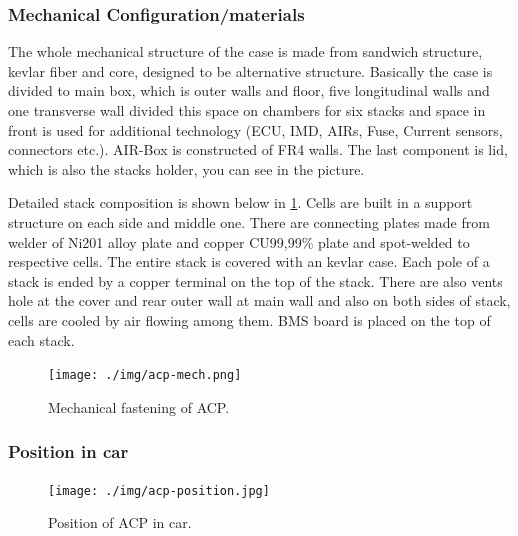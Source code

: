 \subsubsection{Mechanical Configuration/materials}

The whole mechanical structure of the case is made from sandwich structure, kevlar fiber and core, designed to be alternative structure. Basically the case is divided to main box, which is outer walls and floor, five longitudinal walls and one transverse wall divided this space on chambers for six stacks and space in front is used for additional technology (ECU, IMD, AIRs, Fuse, Current sensors, connectors etc.). AIR-Box is constructed of FR4 walls. The last component is lid, which is also the stacks holder, you can see in the picture.

Detailed stack composition is shown below in \ref{fig:acp-mech}. Cells are built in a support structure on each side and middle one. There are connecting plates made from welder of Ni201 alloy plate and copper CU99,99\% plate and spot-welded to respective cells. The entire stack is covered with an kevlar case. Each pole of a stack is ended by a copper terminal on the top of the stack. There are also vents hole at the cover and rear outer wall at main wall and also on both sides of stack, cells are cooled by air flowing among them. BMS board is placed on the top of each stack.

\begin{figure}[H]
	\centering
	\texttt{[image: ./img/acp-mech.png]}
	\caption{Mechanical fastening of ACP.}
	\label{fig:acp-mech}
\end{figure}

\subsubsection{Position in car}

\begin{figure}[H]
	\centering
	\texttt{[image: ./img/acp-position.jpg]}
	\caption{Position of ACP in car.}
	\label{fig:ACP-position}
\end{figure}






